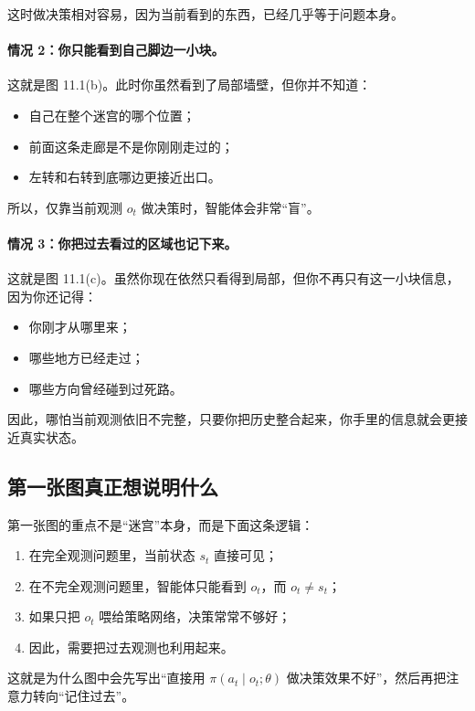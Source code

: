 \documentclass[12pt,a4paper]{ctexart}
\begin{document}
这时做决策相对容易，因为当前看到的东西，已经几乎等于问题本身。

\paragraph{情况 2：你只能看到自己脚边一小块。}
这就是图 11.1(b)。此时你虽然看到了局部墙壁，但你并不知道：
\begin{itemize}
  \item 自己在整个迷宫的哪个位置；
  \item 前面这条走廊是不是你刚刚走过的；
  \item 左转和右转到底哪边更接近出口。
\end{itemize}

所以，仅靠当前观测 \(o_t\) 做决策时，智能体会非常“盲”。

\paragraph{情况 3：你把过去看过的区域也记下来。}
这就是图 11.1(c)。虽然你现在依然只看得到局部，但你不再只有这一小块信息，因为你还记得：
\begin{itemize}
  \item 你刚才从哪里来；
  \item 哪些地方已经走过；
  \item 哪些方向曾经碰到过死路。
\end{itemize}

因此，哪怕当前观测依旧不完整，只要你把历史整合起来，你手里的信息就会更接近真实状态。

\subsection{第一张图真正想说明什么}

第一张图的重点不是“迷宫”本身，而是下面这条逻辑：
\begin{enumerate}
  \item 在完全观测问题里，当前状态 \(s_t\) 直接可见；
  \item 在不完全观测问题里，智能体只能看到 \(o_t\)，而 \(o_t \neq s_t\)；
  \item 如果只把 \(o_t\) 喂给策略网络，决策常常不够好；
  \item 因此，需要把过去观测也利用起来。
\end{enumerate}

这就是为什么图中会先写出“直接用 \(\pi(a_t \mid o_t; \theta)\) 做决策效果不好”，然后再把注意力转向“记住过去”。
\end{document}
